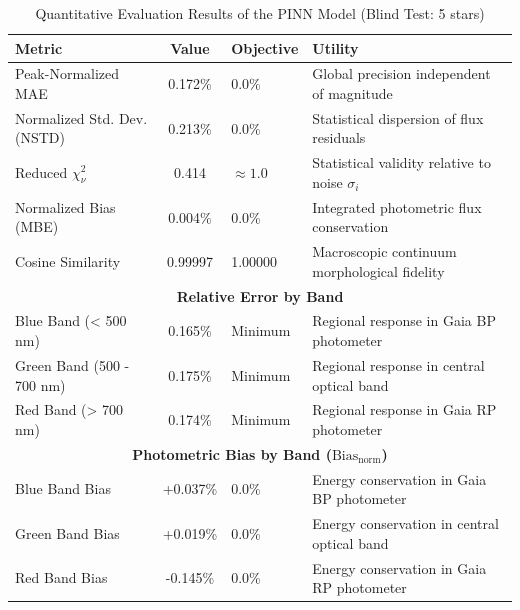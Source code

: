 
\begin{table}[htpb]
\centering
\caption{Quantitative Evaluation Results of the PINN Model (Blind Test: 5 stars)}
\label{tab:pinn_evaluation}
\begin{tabular}{lcll}
\hline
\textbf{Metric} & \textbf{Value} & \textbf{Objective} & \textbf{Utility} \\
\hline
Peak-Normalized MAE & 0.172\% & 0.0\% & Global precision independent of magnitude \\
Normalized Std. Dev. (NSTD) & 0.213\% & 0.0\% & Statistical dispersion of flux residuals \\
Reduced $\chi^2_\nu$ & 0.414 & $\approx 1.0$ & Statistical validity relative to noise $\sigma_i$ \\
Normalized Bias (MBE) & 0.004\% & 0.0\% & Integrated photometric flux conservation \\
Cosine Similarity & 0.99997 & 1.00000 & Macroscopic continuum morphological fidelity \\
\hline
\multicolumn{4}{c}{\textbf{Relative Error by Band}} \\
\hline
Blue Band (< 500 nm) & 0.165\% & Minimum & Regional response in Gaia BP photometer \\
Green Band (500 - 700 nm) & 0.175\% & Minimum & Regional response in central optical band \\
Red Band (> 700 nm) & 0.174\% & Minimum & Regional response in Gaia RP photometer \\
\hline
\multicolumn{4}{c}{\textbf{Photometric Bias by Band ($\text{Bias}_{\text{norm}}$)}} \\
\hline
Blue Band Bias & +0.037\% & 0.0\% & Energy conservation in Gaia BP photometer \\
Green Band Bias & +0.019\% & 0.0\% & Energy conservation in central optical band \\
Red Band Bias & -0.145\% & 0.0\% & Energy conservation in Gaia RP photometer \\
\hline
\end{tabular}
\end{table}
